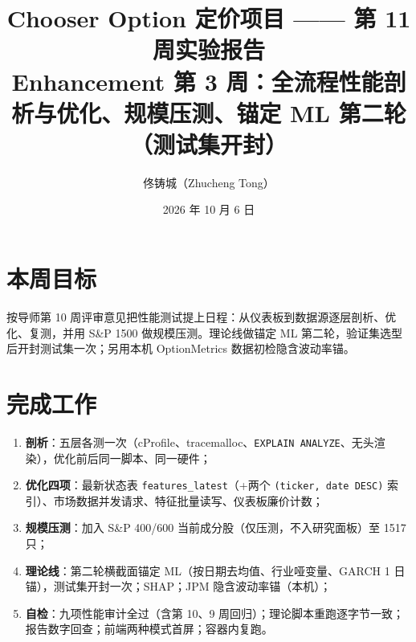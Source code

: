 \documentclass[11pt]{ctexart}
\title{\textbf{Chooser Option 定价项目 —— 第 11 周实验报告}\\
\large Enhancement 第 3 周：全流程性能剖析与优化、规模压测、锚定 ML 第二轮（测试集开封）}
\author{佟铸城（Zhucheng Tong）}
\date{2026 年 10 月 6 日}
\begin{document}
\maketitle

\section{本周目标}
按导师第 10 周评审意见把性能测试提上日程：从仪表板到数据源逐层剖析、优化、复测，并用 S\&P 1500 做规模压测。理论线做锚定 ML 第二轮，验证集选型后开封测试集一次；另用本机 OptionMetrics 数据初检隐含波动率锚。

\section{完成工作}
\begin{enumerate}
  \item \textbf{剖析}：五层各测一次（cProfile、tracemalloc、\texttt{EXPLAIN ANALYZE}、无头渲染），优化前后同一脚本、同一硬件；
  \item \textbf{优化四项}：最新状态表 \texttt{features\_latest}（+两个 \texttt{(ticker, date DESC)} 索引）、市场数据并发请求、特征批量读写、仪表板廉价计数；
  \item \textbf{规模压测}：加入 S\&P 400/600 当前成分股（仅压测，不入研究面板）至 1517 只；
  \item \textbf{理论线}：第二轮横截面锚定 ML（按日期去均值、行业哑变量、GARCH 1 日锚），测试集开封一次；SHAP；JPM 隐含波动率锚（本机）；
  \item \textbf{自检}：九项性能审计全过（含第 10、9 周回归）；理论脚本重跑逐字节一致；报告数字回查；前端两种模式首屏；容器内复跑。
\end{enumerate}
\end{document}
